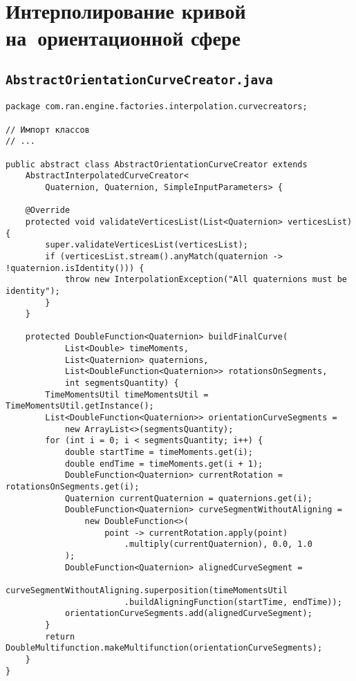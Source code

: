 \chapter{Интерполирование кривой на~ориентационной сфере}

\section*{\texttt{AbstractOrientationCurveCreator.java}}
\begin{verbatim}
package com.ran.engine.factories.interpolation.curvecreators;

// Импорт классов
// ...

public abstract class AbstractOrientationCurveCreator extends
    AbstractInterpolatedCurveCreator<
        Quaternion, Quaternion, SimpleInputParameters> {

    @Override
    protected void validateVerticesList(List<Quaternion> verticesList) {
        super.validateVerticesList(verticesList);
        if (verticesList.stream().anyMatch(quaternion -> !quaternion.isIdentity())) {
            throw new InterpolationException("All quaternions must be identity");
        }
    }

    protected DoubleFunction<Quaternion> buildFinalCurve(
            List<Double> timeMoments,
            List<Quaternion> quaternions,
            List<DoubleFunction<Quaternion>> rotationsOnSegments,
            int segmentsQuantity) {
        TimeMomentsUtil timeMomentsUtil = TimeMomentsUtil.getInstance();
        List<DoubleFunction<Quaternion>> orientationCurveSegments =
            new ArrayList<>(segmentsQuantity);
        for (int i = 0; i < segmentsQuantity; i++) {
            double startTime = timeMoments.get(i);
            double endTime = timeMoments.get(i + 1);
            DoubleFunction<Quaternion> currentRotation = rotationsOnSegments.get(i);
            Quaternion currentQuaternion = quaternions.get(i);
            DoubleFunction<Quaternion> curveSegmentWithoutAligning =
                new DoubleFunction<>(
                    point -> currentRotation.apply(point)
                        .multiply(currentQuaternion), 0.0, 1.0
            );
            DoubleFunction<Quaternion> alignedCurveSegment =
                    curveSegmentWithoutAligning.superposition(timeMomentsUtil
                        .buildAligningFunction(startTime, endTime));
            orientationCurveSegments.add(alignedCurveSegment);
        }
        return DoubleMultifunction.makeMultifunction(orientationCurveSegments);
    }
}
\end{verbatim}

